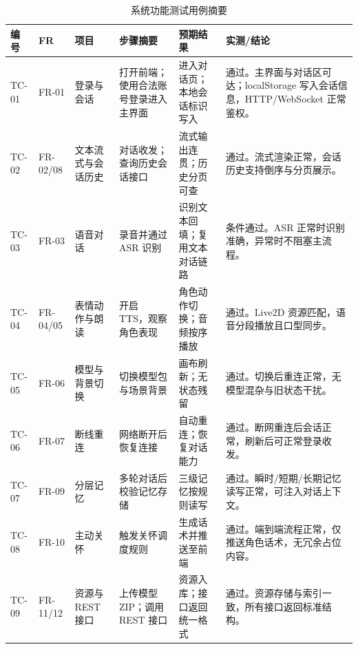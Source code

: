 \documentclass{base}
\begin{document}
\begin{table}[H]
    \centering
    \caption{系统功能测试用例摘要}
    \label{tab:test_cases}
    \begingroup
    \small
    \sloppy
    \setlength{\tabcolsep}{7pt}
    \renewcommand{\arraystretch}{1.38}
    \begin{tabularx}{\textwidth}{@{} >{\raggedright\arraybackslash}p{1.05cm} >{\raggedright\arraybackslash}p{1.25cm} >{\raggedright\arraybackslash}p{2.15cm} X X X @{}}
        \toprule
        \textbf{编号} & \textbf{FR}    & \textbf{项目}      & \textbf{步骤摘要}                & \textbf{预期结果}              & \textbf{实测/结论} \\
        \midrule
        TC-01 & FR-01       & 登录与会话       & 打开前端；使用合法账号登录进入主界面 & 进入对话页；本地会话标识写入 & 通过。主界面与对话区可达；localStorage 写入会话信息，HTTP/WebSocket 正常鉴权。\\
        TC-02 & FR-02/08    & 文本流式与会话历史   & 对话收发；查询历史会话接口 & 流式输出连贯；历史分页可查 & 通过。流式渲染正常，会话历史支持倒序与分页展示。\\
        TC-03 & FR-03       & 语音对话        & 录音并通过 ASR 识别 & 识别文本回填；复用文本对话链路 & 条件通过。ASR 正常时识别准确，异常时不阻塞主流程。\\
        TC-04 & FR-04/05    & 表情动作与朗读     & 开启 TTS，观察角色表现 & 角色动作切换；音频按序播放 & 通过。Live2D 资源匹配，语音分段播放且口型同步。\\
        TC-05 & FR-06       & 模型与背景切换     & 切换模型包与场景背景 & 画布刷新；无状态残留 & 通过。切换后重连正常，无模型混杂与旧状态干扰。\\
        TC-06 & FR-07       & 断线重连        & 网络断开后恢复连接 & 自动重连；恢复对话能力 & 通过。断网重连后会话正常，刷新后可正常登录收发。\\
        TC-07 & FR-09       & 分层记忆        & 多轮对话后校验记忆存储 & 三级记忆按规则读写 & 通过。瞬时/短期/长期记忆读写正常，可注入对话上下文。\\
        TC-08 & FR-10       & 主动关怀        & 触发关怀调度规则 & 生成话术并推送至前端 & 通过。端到端流程正常，仅推送角色话术，无冗余占位内容。\\
        TC-09 & FR-11/12    & 资源与REST接口    & 上传模型ZIP；调用 REST 接口 & 资源入库；接口返回统一格式 & 通过。资源存储与索引一致，所有接口返回标准结构。\\
        \bottomrule
    \end{tabularx}
    \endgroup
\end{table}
\end{document}

